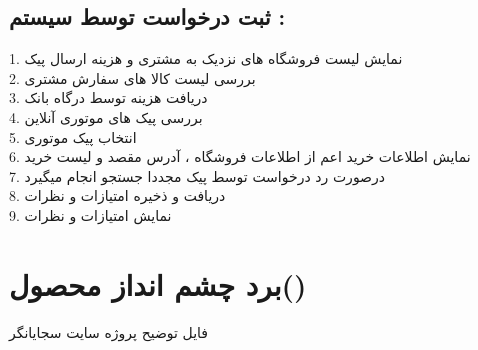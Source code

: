 \documentclass[12pt,onecolumn,a4paper]{article}
\begin{document}
\subsection{
ثبت درخواست توسط سیستم :
}
1.	نمایش لیست فروشگاه های نزدیک به مشتری و هزینه ارسال پیک\\
2.	بررسی لیست کالا های سفارش مشتری\\
3.	دریافت هزینه توسط درگاه بانک\\
4.	بررسی پیک های موتوری آنلاین\\
5.	انتخاب پیک موتوری\\
6.	نمایش اطلاعات خرید اعم از اطلاعات فروشگاه ، آدرس مقصد و لیست خرید\\
7.	درصورت رد درخواست توسط پیک مجددا جستجو انجام میگیرد\\
8.	دریافت و ذخیره امتیازات و نظرات\\
9.	نمایش امتیازات و نظرات\\

\newpage
\section{برد چشم انداز محصول\cite{3}()}
\begin{figure}[!h]
\caption{}\label{figpvb}
\end{figure}


\newpage
\begin{thebibliography}{99}
\bibitem{}
فایل توضیح پروژه
\bibitem{}
سایت سجایانگر
\end{thebibliography}
\end{document}
